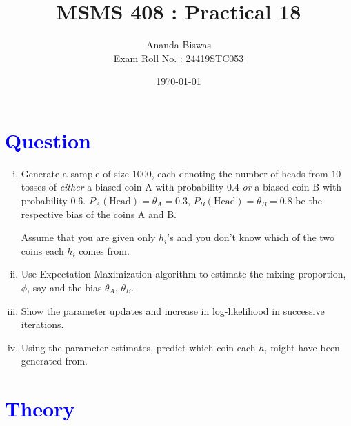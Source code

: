 \documentclass[11pt, a4paper]{article}\usepackage[]{graphicx}\usepackage[]{xcolor}
\title{MSMS 408 : Practical 18}
\author{{\fontsize{25}{20} \benyorithafont Ananda Biswas} \\[1em] Exam Roll No. : 24419STC053}
\date{\today}
\begin{document}
\maketitle


\section*{\faArrowAltCircleRight[regular] \textcolor{blue}{Question}}

\begin{enumerate}[(i)]
\item Generate a sample of size $1000$, each denoting the number of heads from $10$ tosses of \textit{either} a biased coin A with probability $0.4$ \textit{or} a biased coin B with probability $0.6$. $P_A(\text{Head}) = \theta_A = 0.3$, $P_B(\text{Head}) = \theta_B = 0.8$ be the respective bias of the coins A and B.

Assume that you are given only $h_i$'s and you don't know which of the two coins each $h_i$ comes from.

\item Use Expectation-Maximization algorithm to estimate the mixing proportion, $\phi$, say and the bias $\theta_A$, $\theta_B$.

\item Show the parameter updates and increase in log-likelihood in successive iterations.

\item Using the parameter estimates, predict which coin each $h_i$ might have been generated from.
\end{enumerate}


\section*{\faArrowAltCircleRight[regular] \textcolor{blue}{Theory}}

\vspace{1cm}
\end{document}
